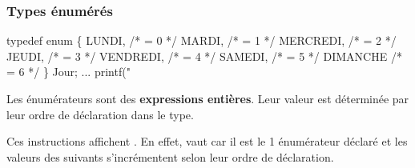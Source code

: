 \begin{frame}[fragile] \frametitle{Types énumérés}
\begin{multicols}{2}
\begin{semiverbatim}\footnotesize
typedef enum \{
    LUNDI,    /* = 0 */
    MARDI,    /* = 1 */
    MERCREDI, /* = 2 */
    JEUDI,    /* = 3 */
    VENDREDI, /* = 4 */
    SAMEDI,   /* = 5 */
    DIMANCHE  /* = 6 */
\} Jour;
...
printf("%
\end{semiverbatim}
Les énumérateurs sont des {\bf expressions entières}. Leur valeur est
déterminée par leur ordre de déclaration dans le type.
\smallskip

Ces instructions affichent .
En effet,  vaut  car il est le 1\ier{} énumérateur
déclaré et les valeurs des suivants s'incrémentent selon leur
ordre de déclaration.
\end{multicols}

\begin{multicols}{2}
\begin{semiverbatim}\footnotesize{}
\end{semiverbatim}\small
{}
\end{multicols}
\end{frame}


